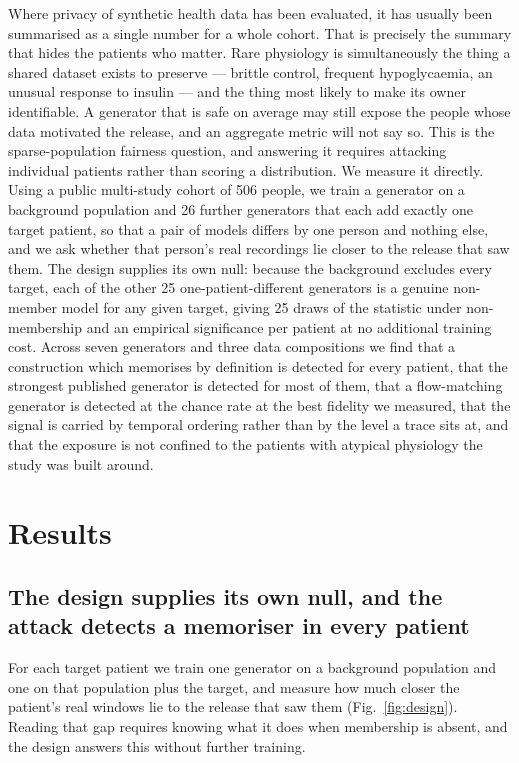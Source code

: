 \documentclass[pdflatex,sn-nature]{sn-jnl}
\theoremstyle{thmstyleone}
\begin{document}
Where privacy of synthetic health data has been evaluated, it has usually been
summarised as a single number for a whole cohort. That is precisely the summary
that hides the patients who matter. Rare physiology is simultaneously the thing a
shared dataset exists to preserve --- brittle control, frequent hypoglycaemia, an
unusual response to insulin --- and the thing most likely to make its owner
identifiable. A generator that is safe on average may still expose the people
whose data motivated the release, and an aggregate metric will not say so. This
is the sparse-population fairness question, and answering it requires attacking
individual patients rather than scoring a distribution.
We measure it directly. Using a public multi-study cohort of 506 people, we
train a generator on a background population and 26 further generators that
each add exactly one target patient, so that a pair of models differs by one
person and nothing else, and we ask whether that person's real recordings lie
closer to the release that saw them. The design supplies its own null: because
the background excludes every target, each of the other 25 one-patient-different
generators is a genuine non-member model for any given target, giving 25 draws
of the statistic under non-membership and an empirical significance per patient
at no additional training cost. Across seven generators and three data
compositions we find that a construction which memorises by definition is
detected for every patient, that the strongest published generator is detected
for most of them, that a flow-matching generator is detected at the
chance rate at the best fidelity we measured, that the signal is carried by
temporal ordering rather than by the level a trace sits at, and that the
exposure is not confined to the patients with atypical physiology the study was
built around.

\section{Results}\label{sec:results}

\subsection{The design supplies its own null, and the attack detects a
memoriser in every patient}\label{subsec:instrument}

For each target patient we train one generator on a background population and
one on that population plus the target, and measure how much closer the
patient's real windows lie to the release that saw them
(Fig.~\ref{fig:design}). Reading that gap requires knowing what it does when
membership is absent, and the design answers this without further training.
\end{document}
